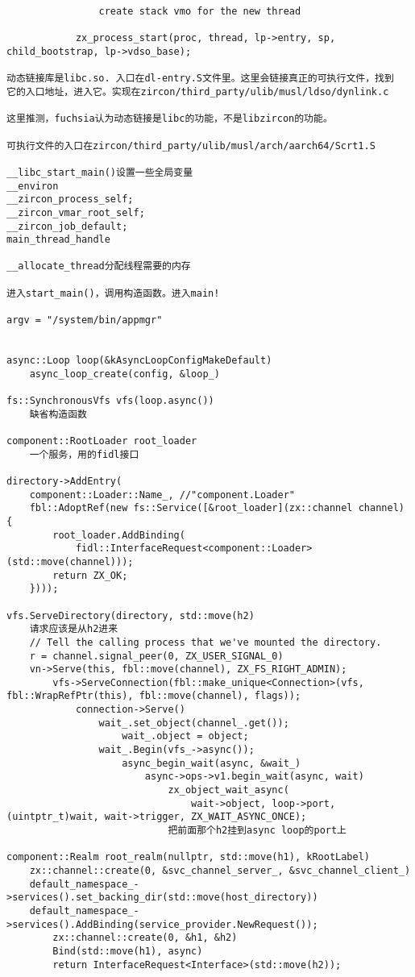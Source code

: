 \begin{verbatim}
                create stack vmo for the new thread

            zx_process_start(proc, thread, lp->entry, sp, child_bootstrap, lp->vdso_base);

动态链接库是libc.so. 入口在dl-entry.S文件里。这里会链接真正的可执行文件，找到
它的入口地址，进入它。实现在zircon/third_party/ulib/musl/ldso/dynlink.c

这里推测，fuchsia认为动态链接是libc的功能，不是libzircon的功能。

可执行文件的入口在zircon/third_party/ulib/musl/arch/aarch64/Scrt1.S

__libc_start_main()设置一些全局变量
__environ
__zircon_process_self;
__zircon_vmar_root_self;
__zircon_job_default;
main_thread_handle

__allocate_thread分配线程需要的内存

进入start_main()，调用构造函数。进入main!

argv = "/system/bin/appmgr"


async::Loop loop(&kAsyncLoopConfigMakeDefault)
    async_loop_create(config, &loop_)
    
fs::SynchronousVfs vfs(loop.async())
    缺省构造函数

component::RootLoader root_loader
    一个服务，用的fidl接口

directory->AddEntry(
    component::Loader::Name_, //"component.Loader"
    fbl::AdoptRef(new fs::Service([&root_loader](zx::channel channel) {
        root_loader.AddBinding(
            fidl::InterfaceRequest<component::Loader>(std::move(channel)));
        return ZX_OK;
    })));

vfs.ServeDirectory(directory, std::move(h2)
    请求应该是从h2进来
    // Tell the calling process that we've mounted the directory.
    r = channel.signal_peer(0, ZX_USER_SIGNAL_0)
    vn->Serve(this, fbl::move(channel), ZX_FS_RIGHT_ADMIN);
        vfs->ServeConnection(fbl::make_unique<Connection>(vfs, fbl::WrapRefPtr(this), fbl::move(channel), flags));
            connection->Serve()
                wait_.set_object(channel_.get());
                    wait_.object = object;
                wait_.Begin(vfs_->async());
                    async_begin_wait(async, &wait_)
                        async->ops->v1.begin_wait(async, wait)
                            zx_object_wait_async(
                                wait->object, loop->port, (uintptr_t)wait, wait->trigger, ZX_WAIT_ASYNC_ONCE);
                            把前面那个h2挂到async loop的port上

component::Realm root_realm(nullptr, std::move(h1), kRootLabel)
    zx::channel::create(0, &svc_channel_server_, &svc_channel_client_)
    default_namespace_->services().set_backing_dir(std::move(host_directory))
    default_namespace_->services().AddBinding(service_provider.NewRequest());
        zx::channel::create(0, &h1, &h2) 
        Bind(std::move(h1), async) 
        return InterfaceRequest<Interface>(std::move(h2));


\end{verbatim}
